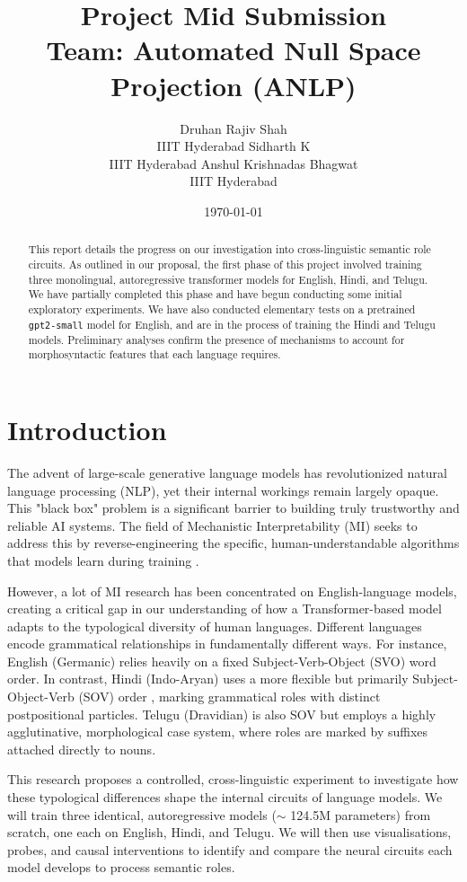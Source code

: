 \documentclass[11pt]{article}
\author{Druhan Rajiv Shah \\ IIIT Hyderabad \And Sidharth K \\ IIIT Hyderabad \And Anshul Krishnadas Bhagwat \\ IIIT Hyderabad}
\date{\today}
\title{Project Mid Submission\\\medskip
\large Team: Automated Null Space Projection (ANLP)}
\begin{document}
\maketitle
\begin{abstract}
This report details the progress on our investigation into cross-linguistic semantic role circuits. As outlined in our proposal, the first phase of this project involved training three monolingual, autoregressive transformer models for English, Hindi, and Telugu. We have partially completed this phase and have begun conducting some initial exploratory experiments. We have also conducted elementary tests on a pretrained \texttt{gpt2-small} model for English, and are in the process of training the Hindi and Telugu models. Preliminary analyses confirm the presence of mechanisms to account for morphosyntactic features that each language requires.
\end{abstract}
\section*{Introduction}
\label{sec:orgbe3a674}

The advent of large-scale generative language models has revolutionized natural language processing (NLP), yet their internal workings remain largely opaque. This "black box" problem is a significant barrier to building truly trustworthy and reliable AI systems. The field of Mechanistic Interpretability (MI) seeks to address this by reverse-engineering the specific, human-understandable algorithms that models learn during training \citep{elhage2021mathematical}.

However, a lot of MI research has been concentrated on English-language models, creating a critical gap in our understanding of how a Transformer-based model adapts to the typological diversity of human languages. Different languages encode grammatical relationships in fundamentally different ways. For instance, English (Germanic) relies heavily on a fixed Subject-Verb-Object (SVO) word order. In contrast, Hindi (Indo-Aryan) uses a more flexible but primarily Subject-Object-Verb (SOV) order \citep{verma1970word}, marking grammatical roles with distinct postpositional particles. Telugu (Dravidian) is also SOV but employs a highly agglutinative, morphological case system, where roles are marked by suffixes attached directly to nouns.

This research proposes a controlled, cross-linguistic experiment to investigate how these typological differences shape the internal circuits of language models. We will train three identical, autoregressive models (\(\sim\) 124.5M parameters) from scratch, one each on English, Hindi, and Telugu. We will then use visualisations, probes, and causal interventions to identify and compare the neural circuits each model develops to process semantic roles.
\end{document}
